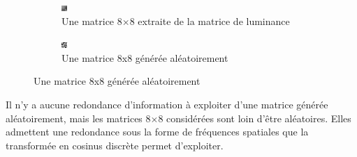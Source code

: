 \documentclass{article}
\begin{document}
\begin{figure}[htbp]
    \centering
    \begin{subfigure}[b]{0.3\textwidth}
        \centering
        \includegraphics[width=.6\linewidth]{bloc_88.png}
        \caption*{\centering Une matrice 8$\times$8 extraite de la matrice de luminance}
    \end{subfigure}
    \hspace{1cm}
    \begin{subfigure}[b]{0.3\textwidth}
        \centering
        \includegraphics[width=.6\linewidth]{mat88_genere_aleatoirement.png}
        \caption*{\centering Une matrice 8x8 générée aléatoirement}
    \end{subfigure}
\end{figure}

Il n'y a aucune redondance d'information à exploiter d'une matrice générée aléatoirement, mais les matrices 8$\times$8 considérées sont loin d'être aléatoires. Elles admettent une redondance sous la forme de fréquences spatiales que la transformée en cosinus discrète permet d'exploiter.
\end{document}
